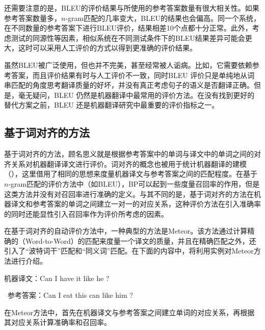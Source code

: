 \parinterval 还需要注意的是，BLEU的评价结果与所使用的参考答案数量有很大相关性。如果参考答案数量多，$n$-gram匹配的几率变大，BLEU的结果也会偏高。同一个系统，在不同数量的参考答案下进行BLEU评价，结果相差10个点都十分正常。此外，考虑测试的同源性等因素，相似系统在不同测试条件下的BLEU结果差异可能会更大，这时可以采用人工评价的方式以得到更准确的评价结果。

\parinterval 虽然BLEU被广泛使用，但也并不完美，甚至经常被人诟病。比如，它需要依赖参考答案，而且评价结果有时与人工评价不一致，同时BLEU 评价只是单纯地从词串匹配的角度思考翻译质量的好坏，并没有真正考虑句子的语义是否翻译正确。但是，毫无疑问，BLEU 仍然是机器翻译中最常用的评价方法。在没有找到更好的替代方案之前，BLEU 还是机器翻译研究中最重要的评价指标之一。


\subsection{基于词对齐的方法}

\parinterval 基于词对齐的方法，顾名思义就是根据参考答案中的单词与译文中的单词之间的对齐关系对机器翻译译文进行评价。词对齐的概念也被用于统计机器翻译的建模（\chapterfive），这里借用了相同的思想来度量机器译文与参考答案之间的匹配程度。在基于$n$-gram匹配的评价方法中（如BLEU），BP可以起到一些度量召回率的作用，但是这类方法并没有对召回率进行准确的定义。与其不同的是，基于词对齐的方法在机器译文和参考答案的单词之间建立一对一的对应关系，这种评价方法在引入准确率的同时还能显性引入召回率作为评价所考虑的因素。

\parinterval 在基于词对齐的自动评价方法中，一种典型的方法是Meteor。该方法通过计算精确的{\small{}}（Word-to-Word）的匹配来度量一个译文的质量，并且在精确匹配之外，还引入了“波特词干”匹配和“同义词”匹配。在下面的内容中，将利用实例对Meteor方法进行介绍。

\begin{example}
机器译文：Can I have it like he ?

\qquad\  参考答案：Can I eat this can like him ?
\label{eg:4-2}
\end{example}

\parinterval 在Meteor方法中，首先在机器译文与参考答案之间建立单词的对应关系，再根据其对应关系计算准确率和召回率。

